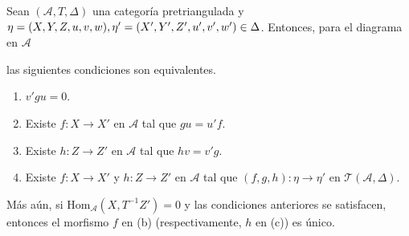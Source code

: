 \documentclass[tesis]{subfiles}
\begin{document}
\begin{Prop}\label{Mendoza_CT-Ejer.9}

    Sean $(\mathscr{A},T,\Delta)$ una categoría pretriangulada y $\eta=(X,Y,Z,u,v,w), \eta'=(X',Y',\break Z',u',v',w')\in\Delta$. Entonces, para el diagrama en $\mathscr{A}$
    \begin{center}
    \end{center}
    las siguientes condiciones son equivalentes.

    \begin{enumerate}[label=(\alph*)]
    
        \item $v'gu=0$.

        \item Existe $f:X\to X'$ en $\mathscr{A}$ tal que $gu = u'f$.

        \item Existe $h:Z\to Z'$ en $\mathscr{A}$ tal que $hv = v'g$.

        \item Existe $f:X\to X'$ y $h:Z\to Z'$ en $\mathscr{A}$ tal que $(f,g,h):\eta\to \eta'$ en $\mathscr{T}(\mathscr{A},\Delta)$.
    \end{enumerate}
    Más aún, si $\text{Hom}_\mathscr{A}(X,T^{-1}Z')=0$ y las condiciones anteriores se satisfacen, entonces el morfismo $f$ en (b) (respectivamente, $h$ en (c)) es único.
    
\end{Prop}
\end{document}
